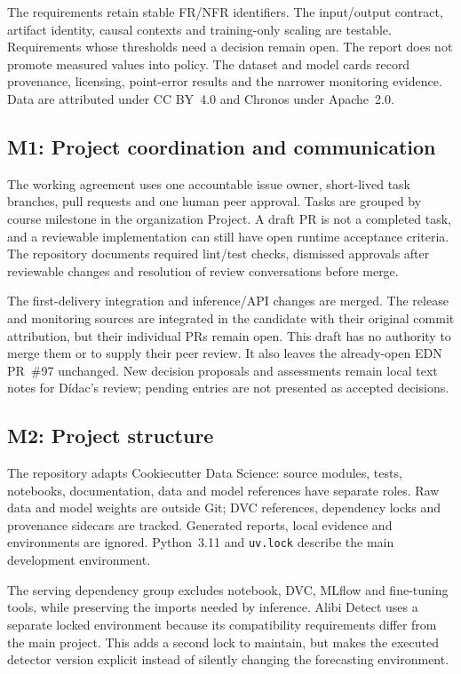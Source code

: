 \documentclass[a4paper,11pt]{article}
\begin{document}
The requirements retain stable FR/NFR identifiers. The input/output contract,
artifact identity, causal contexts and training-only scaling are testable.
Requirements whose thresholds need a decision remain open. The report does not
promote measured values into policy. The dataset and model cards record
provenance, licensing, point-error results and the narrower monitoring evidence.
Data are attributed under CC BY~4.0 and Chronos under Apache~2.0.

\subsection{M1: Project coordination and communication}

The working agreement uses one accountable issue owner, short-lived task
branches, pull requests and one human peer approval. Tasks are grouped by course
milestone in the organization Project. A draft PR is not a completed task, and a
reviewable implementation can still have open runtime acceptance criteria.
The repository documents required lint/test checks, dismissed approvals after
reviewable changes and resolution of review conversations before merge.

The first-delivery integration and inference/API changes are merged. The release
and monitoring sources are integrated in the candidate with their original commit
attribution, but their individual PRs remain open. This draft has no authority to
merge them or to supply their peer review. It also leaves the already-open EDN
PR~\#97 unchanged. New decision proposals and assessments remain local text
notes for Dídac's review; pending entries are not presented as accepted decisions.

\subsection{M2: Project structure}

The repository adapts Cookiecutter Data Science: source modules, tests, notebooks,
documentation, data and model references have separate roles. Raw data and model
weights are outside Git; DVC references, dependency locks and provenance sidecars
are tracked. Generated reports, local evidence and environments are ignored.
Python~3.11 and \texttt{uv.lock} describe the main development environment.

The serving dependency group excludes notebook, DVC, MLflow and fine-tuning tools,
while preserving the imports needed by inference. Alibi Detect uses a separate
locked environment because its compatibility requirements differ from the main
project. This adds a second lock to maintain, but makes the executed detector
version explicit instead of silently changing the forecasting environment.
\end{document}
